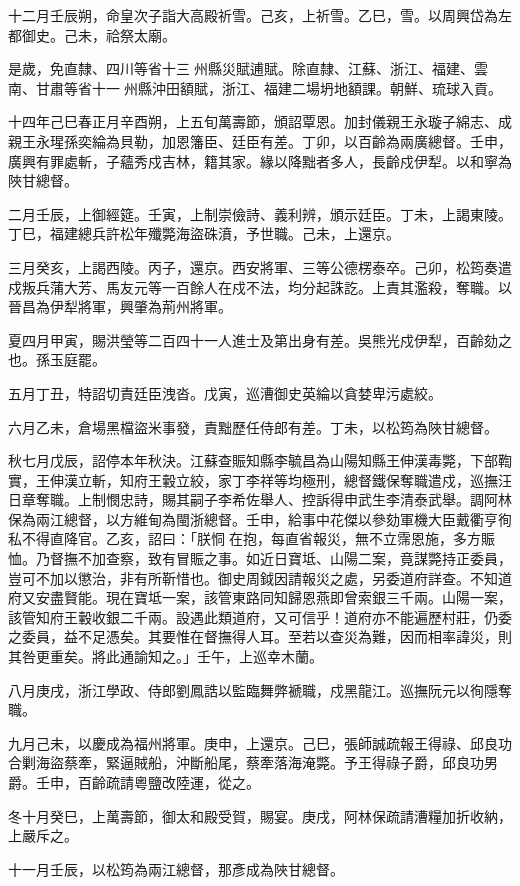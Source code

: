 \begin{pinyinscope}
十二月壬辰朔，命皇次子詣大高殿祈雪。己亥，上祈雪。乙巳，雪。以周興岱為左都御史。己未，祫祭太廟。

是歲，免直隸、四川等省十三州縣災賦逋賦。除直隸、江蘇、浙江、福建、雲南、甘肅等省十一州縣沖田額賦，浙江、福建二場坍地額課。朝鮮、琉球入貢。

十四年己巳春正月辛酉朔，上五旬萬壽節，頒詔覃恩。加封儀親王永璇子綿志、成親王永瑆孫奕綸為貝勒，加恩籓臣、廷臣有差。丁卯，以百齡為兩廣總督。壬申，廣興有罪處斬，子蘊秀戍吉林，籍其家。緣以降黜者多人，長齡戍伊犁。以和寧為陜甘總督。

二月壬辰，上御經筵。壬寅，上制崇儉詩、義利辨，頒示廷臣。丁未，上謁東陵。丁巳，福建總兵許松年殲斃海盜硃濆，予世職。己未，上還京。

三月癸亥，上謁西陵。丙子，還京。西安將軍、三等公德楞泰卒。己卯，松筠奏遣戍叛兵蒲大芳、馬友元等一百餘人在戍不法，均分起誅訖。上責其濫殺，奪職。以晉昌為伊犁將軍，興肇為荊州將軍。

夏四月甲寅，賜洪瑩等二百四十一人進士及第出身有差。吳熊光戍伊犁，百齡劾之也。孫玉庭罷。

五月丁丑，特詔切責廷臣洩沓。戊寅，巡漕御史英綸以貪婪卑污處絞。

六月乙未，倉場黑檔盜米事發，責黜歷任侍郎有差。丁未，以松筠為陜甘總督。

秋七月戊辰，詔停本年秋決。江蘇查賑知縣李毓昌為山陽知縣王伸漢毒斃，下部鞫實，王伸漢立斬，知府王轂立絞，家丁李祥等均極刑，總督鐵保奪職遣戍，巡撫汪日章奪職。上制憫忠詩，賜其嗣子李希佐舉人、控訴得申武生李清泰武舉。調阿林保為兩江總督，以方維甸為閩浙總督。壬申，給事中花傑以參劾軍機大臣戴衢亨徇私不得直降官。乙亥，詔曰：「朕恫在抱，每直省報災，無不立霈恩施，多方賑恤。乃督撫不加查察，致有冒賑之事。如近日寶坻、山陽二案，竟謀斃持正委員，豈可不加以懲治，非有所靳惜也。御史周鉞因請報災之處，另委道府詳查。不知道府又安盡賢能。現在寶坻一案，該管東路同知歸恩燕即曾索銀三千兩。山陽一案，該管知府王轂收銀二千兩。設遇此類道府，又可信乎！道府亦不能遍歷村莊，仍委之委員，益不足憑矣。其要惟在督撫得人耳。至若以查災為難，因而相率諱災，則其咎更重矣。將此通諭知之。」壬午，上巡幸木蘭。

八月庚戌，浙江學政、侍郎劉鳳誥以監臨舞弊褫職，戍黑龍江。巡撫阮元以徇隱奪職。

九月己未，以慶成為福州將軍。庚申，上還京。己巳，張師誠疏報王得祿、邱良功合剿海盜蔡牽，緊逼賊船，沖斷船尾，蔡牽落海淹斃。予王得祿子爵，邱良功男爵。壬申，百齡疏請粵鹽改陸運，從之。

冬十月癸巳，上萬壽節，御太和殿受賀，賜宴。庚戌，阿林保疏請漕糧加折收納，上嚴斥之。

十一月壬辰，以松筠為兩江總督，那彥成為陜甘總督。


\end{pinyinscope}
